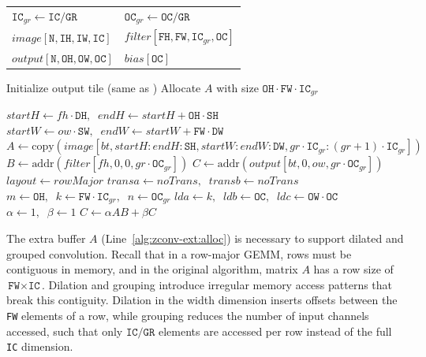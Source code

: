 \begin{algorithm}[t]
\caption{Extended \algname algorithm.}
\label{alg:zconv-ext}
\small
\begin{algorithmic}[1]
\Require
\begin{tabular}[t]{@{}ll@{}}
$\texttt{IC}_{gr} \gets \texttt{IC}/\texttt{GR}$ & $\texttt{OC}_{gr} \gets \texttt{OC}/\texttt{GR}$ \\
$image[\texttt{N},\texttt{IH},\texttt{IW},\texttt{IC}]$ & $filter[\texttt{FH},\texttt{FW},\texttt{IC}_{gr},\texttt{OC}]$ \\
$output[\texttt{N},\texttt{OH},\texttt{OW},\texttt{OC}]$ & $bias[\texttt{OC}]$
\end{tabular}

 
   
    \State Initialize output tile (same as )
    \State Allocate $A$ with size $\texttt{OH} \cdot \texttt{FW} \cdot \texttt{IC}_{gr}$ \label{alg:zconv-ext:alloc}

       \label{alg:zconv-ext:gr}
      \State $startH \gets fh \cdot \texttt{DH},\;\; endH \gets startH + \texttt{OH} \cdot \texttt{SH}$
      \State $startW \gets ow \cdot \texttt{SW},\;\; endW \gets startW + \texttt{FW} \cdot \texttt{DW}$
        \State $A \gets \text{copy}(image[bt,startH : endH : \texttt{SH}, startW : endW : \texttt{DW},gr\cdot \texttt{IC}_{gr} : (gr+1)\cdot \texttt{IC}_{gr}])$
        \State $B \gets \text{addr}(filter[fh,0,0,gr \cdot \texttt{OC}_{gr}])$ \label{alg:zconv-ext:b}
        \State $C \gets \text{addr}(output[bt,0,ow,gr \cdot \texttt{OC}_{gr}])$ \label{alg:zconv-ext:c}
        \State $layout \gets rowMajor$
        \State $transa \gets noTrans,\;\; transb \gets noTrans$
        \State $m \gets \texttt{OH},\;\; k \gets \texttt{FW} \cdot \texttt{IC}_{gr},\;\; n \gets \texttt{OC}_{gr}$
        \State $lda \gets k,\;\; ldb \gets \texttt{OC},\;\; ldc \gets \texttt{OW} \cdot \texttt{OC}$
        \State $\alpha \gets 1,\;\; \beta \gets 1$
        \State $C \gets \alpha A B + \beta C$
      \EndFor
    \EndFor
  \EndFor
\EndFor
\end{algorithmic}
\end{algorithm}

The extra buffer $A$ (Line~\ref{alg:zconv-ext:alloc}) is necessary to support dilated and grouped convolution.
Recall that in a row-major GEMM, rows must be contiguous in memory, and in the original algorithm, matrix $A$ has a row size of $\texttt{FW}\times\texttt{IC}$.
Dilation and grouping introduce irregular memory access patterns that break this contiguity.
Dilation in the width dimension inserts offsets between the \texttt{FW} elements of a row, while grouping reduces the number of input channels accessed, such that only $\texttt{IC}/\texttt{GR}$ elements are accessed per row instead of the full \texttt{IC} dimension.

